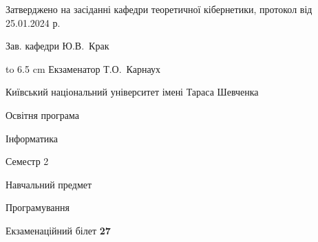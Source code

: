\documentclass[12pt, ukrainian]{article}
\begin{document}
{\smallskip\smallskip \begin {scriptsize} Затверджено на засіданні кафедри теоретичної кібернетики, протокол   від   25.01.2024 р.\par\smallskip\smallskip\smallskip\smallskip
{\parbox {6.5 cm} {Зав. кафедри \dotfill Ю.В.~Крак}}\hspace {0.7cm} {\hbox to 6.5 cm { Екзаменатор \dotfill Т.О.~Карнаух}} \end{scriptsize}}
\newpage
{{\begin {scriptsize}\par
{ \center  Київський національний університет імені Тараса Шевченка \par}
{\parbox {5 cm}{Освітня програма \hfill}{\parbox {7 cm}{Інформатика\hfill}}\parbox {6 cm}{\hfill Семестр 2}}\par
{\parbox {5 cm} {Навчальний предмет \hfill}\parbox {7 cm}{Програмування \hfill}\parbox {6cm}{\hfill}\par}\vspace{-15pt} \end{scriptsize}}{\center Екзаменаційний білет \No \textbf { 27 }\par}}
\end{document}

